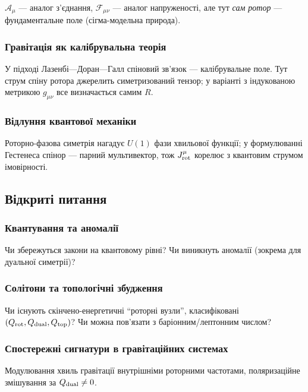 \documentclass[11pt,a4paper]{article}
\numberwithin{equation}{section}
\theoremstyle{plain}
\theoremstyle{definition}
\theoremstyle{remark}
\begin{document}
$\mathcal{A}_\mu$ — аналог з’єднання, $\mathcal{F}_{\mu\nu}$ — аналог напруженості, але тут \emph{сам ротор} — фундаментальне поле (сігма-модельна природа).

\subsubsection{Гравітація як калібрувальна теорія}

У підході Лазенбі—Доран—Галл спіновий зв’язок — калібрувальне поле. Тут струм спіну ротора джерелить симетризований тензор; у варіанті з індукованою метрикою $g_{\mu\nu}$ все визначається самим $R$.

\subsubsection{Відлуння квантової механіки}

Роторно-фазова симетрія нагадує $U(1)$ фази хвильової функції; у формулюванні Гестенеса спінор — парний мультивектор, тож $J^\mu_{\rm rot}$ корелює з квантовим струмом імовірності.

\subsection{Відкриті питання}

\subsubsection{Квантування та аномалії}

Чи збережуться закони на квантовому рівні? Чи виникнуть аномалії (зокрема для дуальної симетрії)?

\subsubsection{Солітони та топологічні збудження}

Чи існують скінчено-енергетичні “роторні вузли”, класифіковані $(Q_{\rm rot},Q_{\rm dual},Q_{\rm top})$? Чи можна пов’язати з баріонним/лептонним числом?

\subsubsection{Спостережні сигнатури в гравітаційних системах}

Модулювання хвиль гравітації внутрішніми роторними частотами, поляризаційне змішування за $Q_{\rm dual}\neq 0$.
\end{document}
